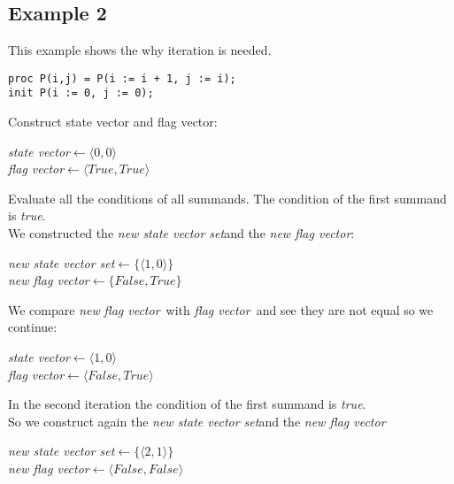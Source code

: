 \documentclass[a4paper,10pt]{article}
\newcommand{\ti}{\textit}
\newcommand{\sv}{\textit{state vector}}
\newcommand{\fv}{\textit{flag vector}}
\newcommand{\svs}{\textit{new state vector set}}
\newcommand{\nfv}{\textit{new flag vector}}
\newcommand{\la}{$\leftarrow$}
\begin{document}
\subsection{Example 2}
This example shows the why iteration is needed.
\begin{verbatim}
proc P(i,j) = P(i := i + 1, j := i);
init P(i := 0, j := 0); 
\end{verbatim}
 
Construct state vector and flag vector: 
\begin{center}\begin{minipage}{250pt}
\sv \la  $\langle 0 , 0 \rangle$\\
\fv \la  $\langle True , True \rangle$\\
\end{minipage}\end{center}

Evaluate all the conditions of all summands.
The condition of the first summand is \ti{true}.\\

We constructed the \svs and the \nfv :
\begin{center}\begin{minipage}{250pt}
\svs \la  $\lbrace \langle 1 , 0 \rangle \rbrace $\\
\nfv \la  $\lbrace False , True \rbrace $\\
\end{minipage}\end{center}

We compare \ti{new} \fv\ with \fv\ and see they are not equal so we continue:
\begin{center}\begin{minipage}{250pt}
\sv \la $\langle 1 , 0 \rangle $\\
\fv \la $\langle False , True \rangle $\\
\end{minipage}\end{center}

In the second iteration the condition of the first summand is \ti{true}.\\
So we construct again the \svs and the \nfv\: 
\begin{center}\begin{minipage}{250pt}
\svs \la  $\lbrace \langle 2 , 1 \rangle \rbrace $\\
\nfv \la  $\langle False , False \rangle $ \\
\end{minipage}\end{center}
\end{document}
